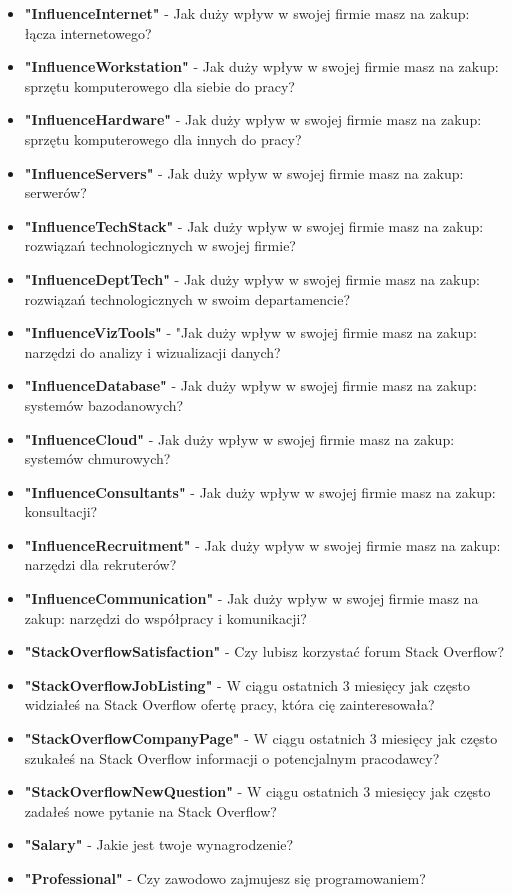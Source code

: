\begin{appendices}
\begin{itemize}
        \item \textbf{"InfluenceInternet"} - Jak duży wpływ w swojej firmie masz na zakup: łącza internetowego?
        \item \textbf{"InfluenceWorkstation"} - Jak duży wpływ w swojej firmie masz na zakup: sprzętu komputerowego dla siebie do pracy?
        \item \textbf{"InfluenceHardware"} - Jak duży wpływ w swojej firmie masz na zakup: sprzętu komputerowego dla innych do pracy?
        \item \textbf{"InfluenceServers"} - Jak duży wpływ w swojej firmie masz na zakup: serwerów?
        \item \textbf{"InfluenceTechStack"} - Jak duży wpływ w swojej firmie masz na zakup: rozwiązań technologicznych w swojej firmie?
        \item \textbf{"InfluenceDeptTech"} - Jak duży wpływ w swojej firmie masz na zakup: rozwiązań technologicznych w swoim departamencie?
        \item \textbf{"InfluenceVizTools"} - "Jak duży wpływ w swojej firmie masz na zakup: narzędzi do analizy i wizualizacji danych?
        \item \textbf{"InfluenceDatabase"} - Jak duży wpływ w swojej firmie masz na zakup: systemów bazodanowych?
        \item \textbf{"InfluenceCloud"} - Jak duży wpływ w swojej firmie masz na zakup: systemów chmurowych?
        \item \textbf{"InfluenceConsultants"} - Jak duży wpływ w swojej firmie masz na zakup: konsultacji?
        \item \textbf{"InfluenceRecruitment"} - Jak duży wpływ w swojej firmie masz na zakup: narzędzi dla rekruterów?
        \item \textbf{"InfluenceCommunication"} - Jak duży wpływ w swojej firmie masz na zakup: narzędzi do współpracy i komunikacji?
        \item \textbf{"StackOverflowSatisfaction"} - Czy lubisz korzystać forum Stack Overflow?
        \item \textbf{"StackOverflowJobListing"} - W ciągu ostatnich 3 miesięcy jak często widziałeś na Stack Overflow ofertę pracy, która cię zainteresowała?
        \item \textbf{"StackOverflowCompanyPage"} - W ciągu ostatnich 3 miesięcy jak często szukałeś na Stack Overflow informacji o potencjalnym pracodawcy?
        \item \textbf{"StackOverflowNewQuestion"} - W ciągu ostatnich 3 miesięcy jak często zadałeś nowe pytanie na Stack Overflow?
        \item \textbf{"Salary"} - Jakie jest twoje wynagrodzenie?
        \item \textbf{"Professional"} - Czy zawodowo zajmujesz się programowaniem?
    \end{itemize}



\end{appendices}
